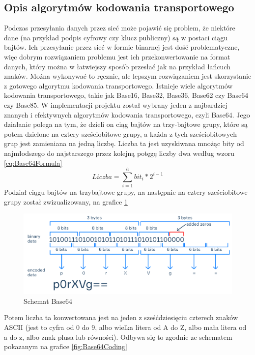 \subsection{Opis algorytmów kodowania transportowego}
Podczas przesyłania danych przez sieć może pojawić się problem, że niektóre dane (na przykład podpis cyfrowy czy klucz publiczny) są w postaci ciągu bajtów. Ich przesyłanie przez sieć w formie binarnej jest dość problematyczne, więc dobrym rozwiązaniem problemu jest ich przekonwertowanie na format danych, który można w łatwiejszy sposób przesłać jak na przykład łańcuch znaków. Można wykonywać to ręcznie, ale lepszym rozwiązaniem jest skorzystanie z gotowego algorytmu kodowania transportowego. Istnieje wiele algorytmów kodowania transportowego, takie jak Base16, Base32, Base36, Base62 czy Base64 czy Base85. W implementacji projektu został wybrany jeden z najbardziej znanych i efektywnych algorytmów kodowania transportowego, czyli Base64. Jego działanie polega na tym, że dzieli on ciąg bajtów na trzy-bajtowe grupy, które są potem dzielone na cztery sześciobitowe grupy, a każda z tych sześciobitowych grup jest zamieniana na jedną liczbę. Liczba ta jest uzyskiwana mnożąc bity od najmłodszego do najstarszego przez kolejną potęgę liczby dwa według wzoru \ref{eq:Base64Formula}
\begin{equation}
    Liczba = \sum_{i=1}^6 bit_i * 2^{i-1}
    \label{eq:Base64Formula}
\end{equation}
Podział ciągu bajtów na trzybajtowe grupy, na następnie na cztery sześciobitowe grupy został zwizualizowany, na grafice \ref{fig:Base64Schema}
\begin{figure}[H]
    \centering
    \includegraphics[width=\textwidth]{Images/Base64Schema.png}
    \caption{Schemat Base64}
	\label{fig:Base64Schema}
\end{figure}
Potem liczba ta konwertowana jest na jeden z sześćdziesięciu czterech znaków ASCII (jest to cyfra od 0 do 9, albo wielka litera od A do Z, albo mała litera od a do z, albo znak plusa lub równości). Odbywa się to zgodnie ze schematem pokazanym na grafice \ref{fig:Base64Coding}
